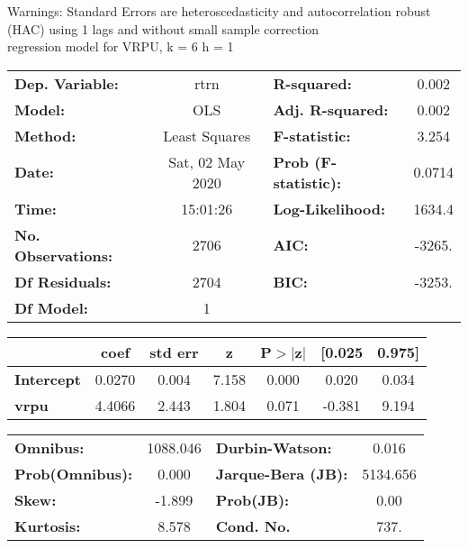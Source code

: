 Warnings: \newline
 [1] Standard Errors are heteroscedasticity and autocorrelation robust (HAC) using 1 lags and without small sample correction\\ 

regression model for VRPU, k = 6 h = 1\begin{center}
\begin{tabular}{lclc}
\toprule
\textbf{Dep. Variable:}    &       rtrn       & \textbf{  R-squared:         } &     0.002   \\
\textbf{Model:}            &       OLS        & \textbf{  Adj. R-squared:    } &     0.002   \\
\textbf{Method:}           &  Least Squares   & \textbf{  F-statistic:       } &     3.254   \\
\textbf{Date:}             & Sat, 02 May 2020 & \textbf{  Prob (F-statistic):} &   0.0714    \\
\textbf{Time:}             &     15:01:26     & \textbf{  Log-Likelihood:    } &    1634.4   \\
\textbf{No. Observations:} &        2706      & \textbf{  AIC:               } &    -3265.   \\
\textbf{Df Residuals:}     &        2704      & \textbf{  BIC:               } &    -3253.   \\
\textbf{Df Model:}         &           1      & \textbf{                     } &             \\
\bottomrule
\end{tabular}
\begin{tabular}{lcccccc}
                   & \textbf{coef} & \textbf{std err} & \textbf{z} & \textbf{P$> |$z$|$} & \textbf{[0.025} & \textbf{0.975]}  \\
\midrule
\textbf{Intercept} &       0.0270  &        0.004     &     7.158  &         0.000        &        0.020    &        0.034     \\
\textbf{vrpu}      &       4.4066  &        2.443     &     1.804  &         0.071        &       -0.381    &        9.194     \\
\bottomrule
\end{tabular}
\begin{tabular}{lclc}
\textbf{Omnibus:}       & 1088.046 & \textbf{  Durbin-Watson:     } &    0.016  \\
\textbf{Prob(Omnibus):} &   0.000  & \textbf{  Jarque-Bera (JB):  } & 5134.656  \\
\textbf{Skew:}          &  -1.899  & \textbf{  Prob(JB):          } &     0.00  \\
\textbf{Kurtosis:}      &   8.578  & \textbf{  Cond. No.          } &     737.  \\
\bottomrule
\end{tabular}
\end{center}


